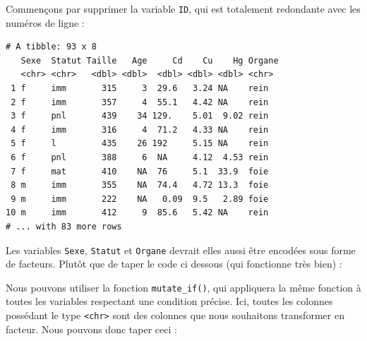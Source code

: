 \documentclass[a4paperpaper,]{article}
\newenvironment{Shaded}{\begin{snugshade}}{\end{snugshade}}
\newcommand{\KeywordTok}[1]{\textcolor[rgb]{0.13,0.29,0.53}{\textbf{#1}}}
\newcommand{\DataTypeTok}[1]{\textcolor[rgb]{0.13,0.29,0.53}{#1}}
\newcommand{\StringTok}[1]{\textcolor[rgb]{0.31,0.60,0.02}{#1}}
\newcommand{\OperatorTok}[1]{\textcolor[rgb]{0.81,0.36,0.00}{\textbf{#1}}}
\newcommand{\NormalTok}[1]{#1}
\theoremstyle{definition}
\theoremstyle{definition}
\theoremstyle{definition}
\theoremstyle{remark}
\begin{document}
Commençons par supprimer la variable \texttt{ID}, qui est totalement
redondante avec les numéros de ligne :

\begin{Shaded}
\end{Shaded}

\begin{verbatim}
# A tibble: 93 x 8
   Sexe  Statut Taille   Age     Cd    Cu    Hg Organe
   <chr> <chr>   <dbl> <dbl>  <dbl> <dbl> <dbl> <chr> 
 1 f     imm       315     3  29.6   3.24 NA    rein  
 2 f     imm       357     4  55.1   4.42 NA    rein  
 3 f     pnl       439    34 129.    5.01  9.02 rein  
 4 f     imm       316     4  71.2   4.33 NA    rein  
 5 f     l         435    26 192     5.15 NA    rein  
 6 f     pnl       388     6  NA     4.12  4.53 rein  
 7 f     mat       410    NA  76     5.1  33.9  foie  
 8 m     imm       355    NA  74.4   4.72 13.3  foie  
 9 m     imm       222    NA   0.09  9.5   2.89 foie  
10 m     imm       412     9  85.6   5.42 NA    rein  
# ... with 83 more rows
\end{verbatim}

Les variables \texttt{Sexe}, \texttt{Statut} et \texttt{Organe} devrait
elles aussi être encodées sous forme de facteurs. Plutôt que de taper le
code ci dessous (qui fonctionne très bien) :

\begin{Shaded}
\end{Shaded}

Nous pouvons utiliser la fonction \texttt{mutate\_if()}, qui appliquera
la même fonction à toutes les variables respectant une condition
précise. Ici, toutes les colonnes possédant le type
\texttt{\textless{}chr\textgreater{}} sont des colonnes que nous
souhaitons transformer en facteur. Nous pouvons donc taper ceci :
\end{document}
